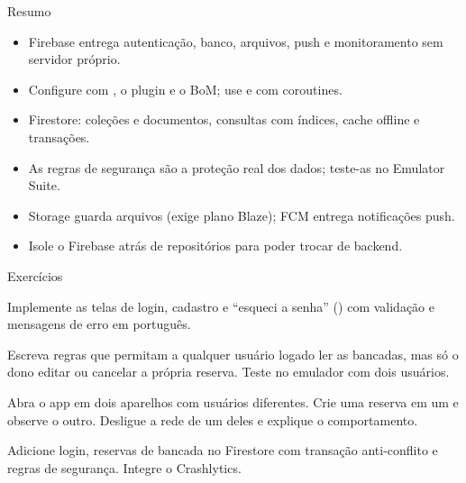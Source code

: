 \documentclass[aspectratio=169,10pt]{beamer}
\begin{document}
\begin{frame}{Resumo}
  \begin{resumo}
    \begin{itemize}
      \item Firebase entrega autenticação, banco, arquivos, push e monitoramento sem servidor próprio.
      \item Configure com , o plugin e o BoM; use  e  com coroutines.
      \item Firestore: coleções e documentos, consultas com índices, cache offline e transações.
      \item As regras de segurança são a proteção real dos dados; teste-as no Emulator Suite.
      \item Storage guarda arquivos (exige plano Blaze); FCM entrega notificações push.
      \item Isole o Firebase atrás de repositórios para poder trocar de backend.
    \end{itemize}
  \end{resumo}
\end{frame}

\begin{frame}{Exercícios}
  \begin{exercicio}
    Implemente as telas de login, cadastro e ``esqueci a senha'' () com validação e mensagens de erro em português.
  \end{exercicio}
  \begin{exercicio}
    Escreva regras que permitam a qualquer usuário logado ler as bancadas, mas só o dono editar ou cancelar a própria reserva. Teste no emulador com dois usuários.
  \end{exercicio}
  \begin{exercicio}
    Abra o app em dois aparelhos com usuários diferentes. Crie uma reserva em um e observe o outro. Desligue a rede de um deles e explique o comportamento.
  \end{exercicio}
  \begin{projeto}
    Adicione login, reservas de bancada no Firestore com transação anti-conflito e regras de segurança. Integre o Crashlytics.
  \end{projeto}
\end{frame}
\end{document}
